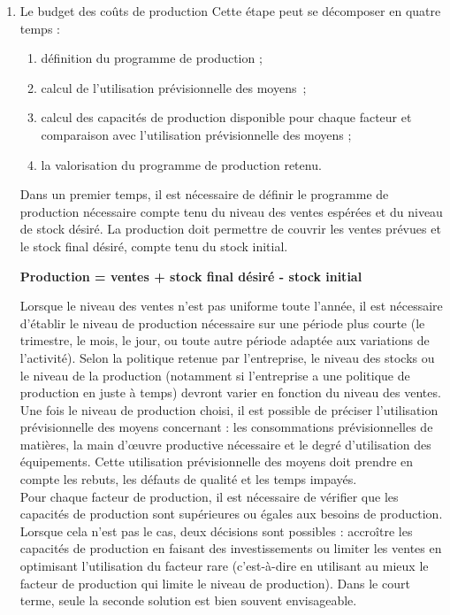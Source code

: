\documentclass{tufte-handout}
\begin{document}
\begin{enumerate}
\item Le budget des coûts de production
\label{sec:org1053162}
Cette étape peut se décomposer en quatre temps :\\
\begin{enumerate}
\item définition du programme de production ;\\
\item calcul de l'utilisation prévisionnelle des moyens ;\\
\item calcul des capacités de production disponible pour chaque facteur et comparaison avec l'utilisation prévisionnelle des moyens ;\\
\item la valorisation du programme de production retenu.\\
\end{enumerate}
Dans un premier temps, il est nécessaire de définir le programme de production nécessaire compte tenu du niveau des ventes espérées et du niveau de stock désiré. La production doit permettre de couvrir les ventes prévues et le stock final désiré, compte tenu du stock initial.\\
\begin{center}
\textbf{Production = ventes + stock final désiré - stock initial}\\
\end{center}
Lorsque le niveau des ventes n'est pas uniforme toute l'année, il est nécessaire d'établir le niveau de production nécessaire sur une période plus courte (le trimestre, le mois, le jour, ou toute autre période adaptée aux variations de l'activité). Selon la politique retenue par l'entreprise, le niveau des stocks ou le niveau de la production (notamment si l'entreprise a une politique de production en juste à temps) devront varier en fonction du niveau des ventes.\\
Une fois le niveau de production choisi, il est possible de préciser l'utilisation prévisionnelle des moyens concernant : les consommations prévisionnelles de matières, la main d'œuvre productive nécessaire et le degré d'utilisation des équipements. Cette utilisation prévisionnelle des moyens doit prendre en compte les rebuts, les défauts de qualité et les temps impayés.\\
Pour chaque facteur de production, il est nécessaire de vérifier que les capacités de production sont supérieures ou égales aux besoins de production. Lorsque cela n'est pas le cas, deux décisions sont possibles : accroître les capacités de production en faisant des investissements ou limiter les ventes en optimisant l'utilisation du facteur rare (c'est-à-dire en utilisant au mieux le facteur de production qui limite le niveau de production). Dans le court terme, seule la seconde solution est bien souvent envisageable.\\

\end{enumerate}
\end{document}
